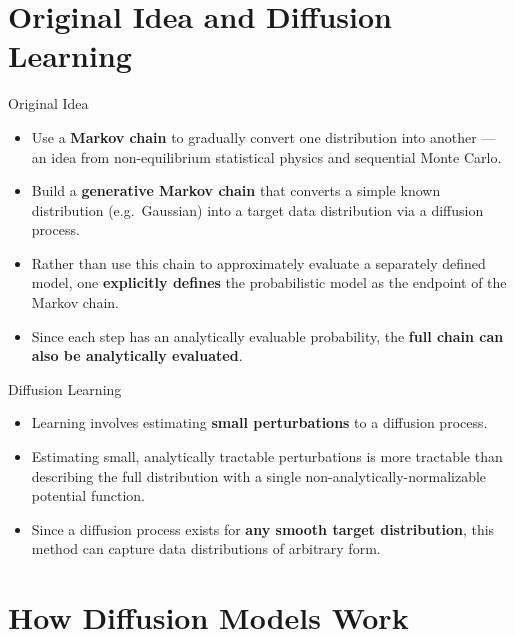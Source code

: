 \documentclass[aspectratio=169,10pt]{beamer}
\begin{document}
\section{Original Idea and Diffusion Learning}

\begin{frame}{Original Idea}
  \begin{itemize}
    \item Use a \textbf{Markov chain} to gradually convert one distribution into
          another — an idea from non-equilibrium statistical physics and
          sequential Monte Carlo.
    \item Build a \textbf{generative Markov chain} that converts a simple known
          distribution (e.g.\ Gaussian) into a target data distribution via a
          diffusion process.
    \item Rather than use this chain to approximately evaluate a separately
          defined model, one \textbf{explicitly defines} the probabilistic model
          as the endpoint of the Markov chain.
    \item Since each step has an analytically evaluable probability,
          the \textbf{full chain can also be analytically evaluated}.
  \end{itemize}
\end{frame}

\begin{frame}{Diffusion Learning}
  \begin{itemize}
    \item Learning involves estimating \textbf{small perturbations} to a
          diffusion process.
    \item Estimating small, analytically tractable perturbations is more
          tractable than describing the full distribution with a single
          non-analytically-normalizable potential function.
    \item Since a diffusion process exists for \textbf{any smooth target
          distribution}, this method can capture data distributions of
          arbitrary form.
  \end{itemize}
\end{frame}

\section{How Diffusion Models Work}
\end{document}
